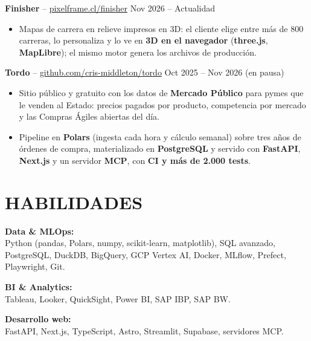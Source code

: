 \documentclass[a4paper,10.5pt]{extarticle}
\begin{document}
\vspace{4pt}

\textbf{Finisher} -- \href{https://pixelframe.cl/finisher/}{pixelframe.cl/finisher} \hfill Nov 2026 -- Actualidad
\begin{itemize}
    \item Mapas de carrera en relieve impresos en 3D: el cliente elige entre más de 800 carreras, lo personaliza y lo ve en \textbf{3D en el navegador} (\textbf{three.js}, \textbf{MapLibre}); el mismo motor genera los archivos de producción.
\end{itemize}

\vspace{4pt}

\textbf{Tordo} -- \href{https://github.com/cris-middleton/tordo}{github.com/cris-middleton/tordo} \hfill Oct 2025 -- Nov 2026 (en pausa)
\begin{itemize}
    \item Sitio público y gratuito con los datos de \textbf{Mercado Público} para pymes que le venden al Estado: precios pagados por producto, competencia por mercado y las Compras Ágiles abiertas del día.
    \item Pipeline en \textbf{Polars} (ingesta cada hora y cálculo semanal) sobre tres años de órdenes de compra, materializado en \textbf{PostgreSQL} y servido con \textbf{FastAPI}, \textbf{Next.js} y un servidor \textbf{MCP}, con \textbf{CI y más de 2.000 tests}.
\end{itemize}

\section*{HABILIDADES}

\textbf{Data \& MLOps:}\\
Python (pandas, Polars, numpy, scikit-learn, matplotlib), SQL avanzado, PostgreSQL, DuckDB, BigQuery, GCP Vertex AI, Docker, MLflow, Prefect, Playwright, Git.

\vspace{4pt}

\textbf{BI \& Analytics:}\\
Tableau, Looker, QuickSight, Power BI, SAP IBP, SAP BW.

\vspace{4pt}

\textbf{Desarrollo web:}\\
FastAPI, Next.js, TypeScript, Astro, Streamlit, Supabase, servidores MCP.
\end{document}
